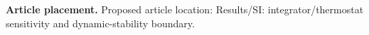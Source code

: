 \textbf{Article placement.} Proposed article location: Results/SI: integrator/thermostat sensitivity and dynamic-stability boundary.
